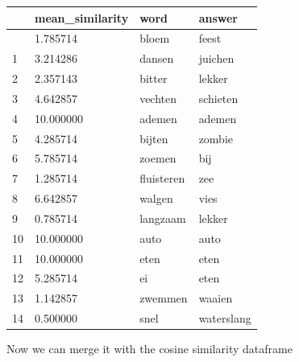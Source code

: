 \documentclass[
  letterpaper,
  DIV=11,
  numbers=noendperiod]{scrreprt}
\begin{document}
\begin{longtable}[]{@{}llll@{}}
\toprule\noalign{}
& mean\_similarity & word & answer \\
\midrule\noalign{}
\endhead
\bottomrule\noalign{}
\endlastfoot
0 & 1.785714 & bloem & feest \\
1 & 3.214286 & dansen & juichen \\
2 & 2.357143 & bitter & lekker \\
3 & 4.642857 & vechten & schieten \\
4 & 10.000000 & ademen & ademen \\
5 & 4.285714 & bijten & zombie \\
6 & 5.785714 & zoemen & bij \\
7 & 1.285714 & fluisteren & zee \\
8 & 6.642857 & walgen & vies \\
9 & 0.785714 & langzaam & lekker \\
10 & 10.000000 & auto & auto \\
11 & 10.000000 & eten & eten \\
12 & 5.285714 & ei & eten \\
13 & 1.142857 & zwemmen & waaien \\
14 & 0.500000 & snel & waterslang \\
\end{longtable}

Now we can merge it with the cosine similarity dataframe
\end{document}
